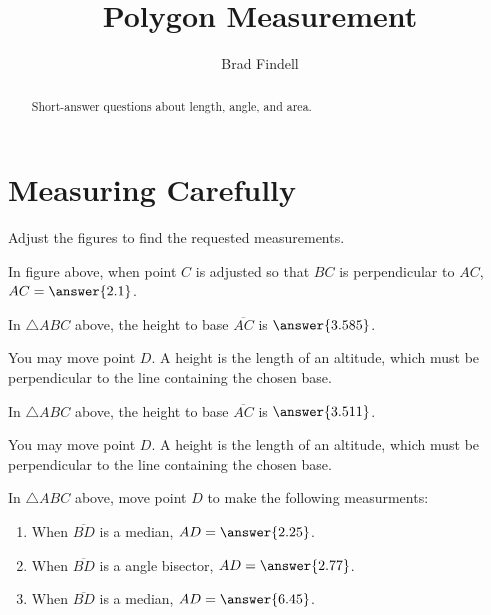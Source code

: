 \documentclass[nooutcomes]{ximera}
\title{Polygon Measurement}
\author{Brad Findell}
\begin{document}
\begin{abstract}
Short-answer questions about length, angle, and area. 
\end{abstract}
\maketitle

\section{Measuring Carefully}
Adjust the figures to find the requested measurements.  

\begin{center}  
\end{center}
\begin{problem}
In figure above, when point $C$ is adjusted so that $BC$ is perpendicular to $AC$, $AC=\answer{2.1}$.
\end{problem}



\begin{center}  
\end{center}
\begin{problem}
In $\triangle ABC$ above, the height to base $\overline{AC}$ is $\answer{3.585}$.
\begin{hint}
You may move point $D$.  A height is the length of an altitude, which must be perpendicular to the line containing the chosen base.  
\end{hint}
\end{problem}

\begin{center}  
\end{center}
\begin{problem}
In $\triangle ABC$ above, the height to base $\overline{AC}$ is $\answer{3.511}$.
\begin{hint}
You may move point $D$.  A height is the length of an altitude, which must be perpendicular to the line containing the chosen base.  
\end{hint}
\end{problem}

\begin{center}  
\end{center}
\begin{problem}
In $\triangle ABC$ above, move point $D$ to make the following measurments: 
\begin{enumerate}
\item When $\overline{BD}$ is a median, $AD=\answer{2.25}$.
\item When $\overline{BD}$ is a angle bisector, $AD=\answer{2.77}$.
\item When $\overline{BD}$ is a median, $AD=\answer{6.45}$.
\end{enumerate}
\end{problem}
\end{document}
